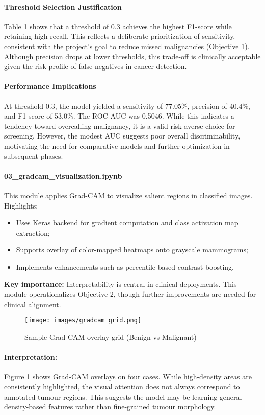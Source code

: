 \documentclass[12pt]{article}
\begin{document}
\paragraph{Threshold Selection Justification}
Table 1 shows that a threshold of 0.3 achieves the highest F1-score while retaining high recall. This reflects a deliberate prioritization of sensitivity, consistent with the project’s goal to reduce missed malignancies (Objective 1). Although precision drops at lower thresholds, this trade-off is clinically acceptable given the risk profile of false negatives in cancer detection.

\paragraph{Performance Implications}
At threshold 0.3, the model yielded a sensitivity of 77.05\%, precision of 40.4\%, and F1-score of 53.0\%. The ROC AUC was 0.5046. While this indicates a tendency toward overcalling malignancy, it is a valid risk-averse choice for screening. However, the modest AUC suggests poor overall discriminability, motivating the need for comparative models and further optimization in subsequent phases.
\paragraph{03\_gradcam\_visualization.ipynb}
This module applies Grad-CAM to visualize salient regions in classified images. Highlights:
\begin{itemize}
    \item Uses Keras backend for gradient computation and class activation map extraction;
    \item Supports overlay of color-mapped heatmaps onto grayscale mammograms;
    \item Implements enhancements such as percentile-based contrast boosting.
\end{itemize}

\textbf{Key importance:} Interpretability is central in clinical deployments. This module operationalizes Objective 2, though further improvements are needed for clinical alignment.

\begin{figure}[H]
\centering
\texttt{[image: images/gradcam\_grid.png]}
\caption{Sample Grad-CAM overlay grid (Benign vs Malignant)}
\end{figure}

\paragraph{Interpretation:}
Figure 1 shows Grad-CAM overlays on four cases. While high-density areas are consistently highlighted, the visual attention does not always correspond to annotated tumour regions. This suggests the model may be learning general density-based features rather than fine-grained tumour morphology.
\end{document}
